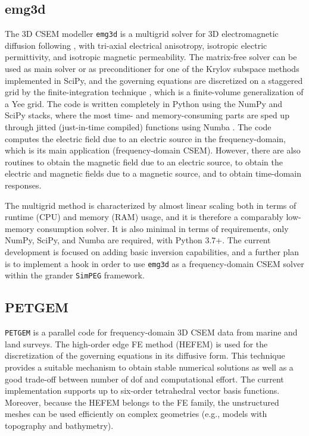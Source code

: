 \documentclass[
    paper,
  ]{geophysics}
\newcommand{\emg}[2]{\texttt{emg#1#2}\xspace}
\newcommand{\simpeg}{\texttt{SimPEG}\xspace}
\newcommand{\petgem}{\texttt{PETGEM}\xspace}
\newcommand{\mycom}[2][]{
  \todo[color=yellow]{\textbf{\uppercase{[#1]}}:~#2}}
\begin{document}
\subsection{emg3d}

The 3D CSEM modeller \emg3d is a multigrid \citep{CMMP.64.Fedorenko} solver for
3D electromagnetic diffusion following \cite{GP.06.Mulder}, with tri-axial
electrical anisotropy, isotropic electric permittivity, and isotropic magnetic
permeability. The matrix-free solver can be used as main solver or as
preconditioner for one of the Krylov subspace methods implemented in SciPy, and
the governing equations are discretized on a staggered grid by the
finite-integration technique \citep{AEU.77.Weiland}, which is a finite-volume
generalization of a Yee grid. The code is written completely in Python using
the NumPy and SciPy stacks, where the most time- and memory-consuming parts are
sped up through jitted (just-in-time compiled) functions using Numba
\citep{LLVM.15.Lam}. The code computes the electric field due to an electric
source in the frequency-domain, which is its main application (frequency-domain
CSEM). However, there are also routines to obtain the magnetic field due to an
electric source, to obtain the electric and magnetic fields due to a magnetic
source, and to obtain time-domain responses.

The multigrid method is characterized by almost linear scaling both in terms of
runtime (CPU) and memory (RAM) usage, and it is therefore a comparably
low-memory consumption solver. It is also minimal in terms of requirements,
only NumPy, SciPy, and Numba are required, with Python 3.7+. The current
development is focused on adding basic inversion capabilities, and a further
plan is to implement a hook in order to use \emg3d as a frequency-domain CSEM
solver within the grander \simpeg framework.

\subsection{PETGEM}

\petgem is a parallel code for frequency-domain 3D CSEM data from marine and
land surveys. The high-order edge FE method (HEFEM) is used for the
discretization of the governing equations in its diffusive form. This technique
provides a suitable mechanism to obtain stable numerical solutions as well as a
good trade-off between number of dof\mycom[OCR]{I assume we have previously
mentioned the term dofs} and computational effort. The current implementation
supports up to six-order tetrahedral vector basis functions. Moreover, because
the HEFEM belongs to the FE family, the unstructured meshes can be used
efficiently on complex geometries (e.g., models with topography and
bathymetry).
\end{document}
